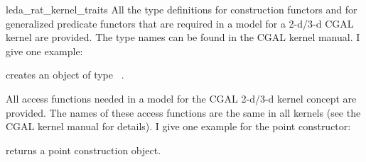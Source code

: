 \begin{ccRefClass}{leda_rat_kernel_traits}
All the type definitions for construction functors and for generalized predicate functors that
are required in a model for a 2-d/3-d CGAL kernel are provided. The type names
can be found in the CGAL kernel manual. I give one example:



\ccHtmlLinksOn


\ccCreation

{creates an object of type \ccRefName\ .}


\ccOperations

All access functions needed in a model for the CGAL 2-d/3-d kernel concept are provided.
The names of these access functions are the same in all kernels (see the CGAL kernel manual 
for details). I give one example for the point constructor:

{ returns a point construction object.}

\ccHtmlLinksOn

\end{ccRefClass} 
